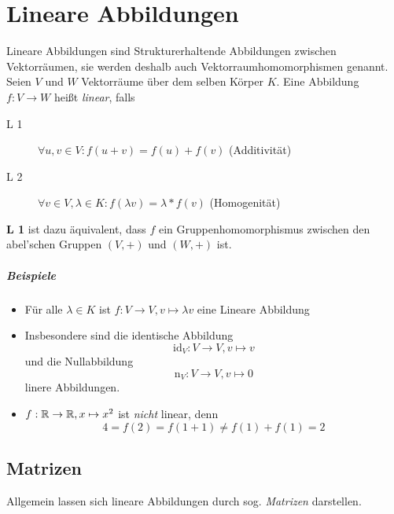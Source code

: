 \chapter{Lineare Abbildungen}
Lineare Abbildungen sind Strukturerhaltende Abbildungen zwischen Vektorräumen, sie werden deshalb auch Vektorraumhomomorphismen genannt.
Seien $V$ und $W$ Vektorräume über dem selben Körper $K$. Eine Abbildung $f:V\rightarrow W$ heißt \emph{linear}, falls
\begin{description}
  \item[L 1] $\forall u,v \in V : f(u+v)= f(u)+f(v)$ (Additivität)
  \item[L 2] $\forall v\in V, \lambda \in K : f(\lambda v) = \lambda * f(v)$ (Homogenität)
\end{description}

\bemerkung
\textbf{L 1} ist dazu äquivalent, dass $f$ ein Gruppenhomomorphismus zwischen den abel'schen Gruppen $(V,+)$ und $(W,+)$ ist.

\paragraph{Beispiele}
\begin{itemize}
  \item Für alle $\lambda \in K$ ist $f:V\rightarrow V, v\mapsto \lambda v$ eine Lineare Abbildung
  \item Insbesondere sind die identische Abbildung
  \begin{equation*}
    \mathrm{id}_V:V\rightarrow V, v\mapsto v
  \end{equation*}
  und die Nullabbildung
  \begin{equation*}
    \mathrm{n}_V:V\rightarrow V, v\mapsto 0
  \end{equation*}
  linere Abbildungen.

  \item $f:\mathbb{R}\rightarrow\mathbb{R}, x\mapsto x^2$ ist \emph{nicht} linear, denn
  \begin{equation*}
    4=f(2)=f(1+1)\neq f(1)+f(1) = 2
  \end{equation*}
\end{itemize}

\section{Matrizen}
Allgemein lassen sich lineare Abbildungen durch sog. \emph{Matrizen} darstellen.

